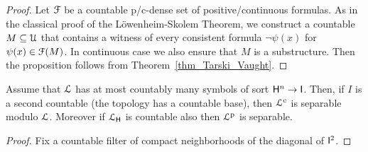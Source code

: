 \documentclass{amsproc}
\newcommand{\mylabel}[1]{{#1}\hfill}
\renewenvironment{itemize}
  {\begin{list}{$\triangleright$}{%
  \setlength{\parskip}{0mm}
  \setlength{\topsep}{.4\baselineskip}
  \setlength{\rightmargin}{0mm}
  \setlength{\listparindent}{0mm}
  \setlength{\itemindent}{0mm}
  \setlength{\labelwidth}{3ex}
  \setlength{\itemsep}{.2\baselineskip}
  \setlength{\parsep}{.2\baselineskip}
  \setlength{\partopsep}{0mm}
  \setlength{\labelsep}{1ex}
  \setlength{\leftmargin}{\labelwidth+\labelsep}
  \let\makelabel\mylabel}}{%
\end{list}}
\renewcommand*{\emph}[1]{%
   \smash{\tikz[baseline]\node[rectangle, fill=teal!25, rounded corners, inner xsep=0.5ex, inner ysep=0.2ex, anchor=base, minimum height = 2.7ex]{\strut #1};}}
\begin{document}
{\begin{proof}
  Let ${\EuScript F}$ be a countable p/c-dense set of positive/continuous formulas.
  As in the classical proof of the L\"owenheim-Skolem Theorem, we construct a countable $M\subseteq{\EuScript U}$ that contains a witness of every consistent formula $\neg\psi(x)$ for $\psi(x)\in{\EuScript F}(M)$.
  In continuous case we also ensure that $M$ is a substructure.
  Then the proposition follows from Theorem~\ref{thm_Tarski_Vaught}.
\end{proof}

\begin{proposition}
  Assume that ${\EuScript L}$ has at most countably many symbols of sort ${\sf H}^n\to {\sf I}$.
  Then, if $I$ is a second countable (the topology has a countable base), then ${\EuScript L}^{\rm c}$ is separable modulo ${\EuScript L}$.
  Moreover if ${\EuScript L}_{\sf H}$ is countable also then ${\EuScript L}^{\rm p}$ is separable.
\end{proposition}

\begin{proof}
  Fix a countable filter of compact neighborhoods of the diagonal of ${\sf I}^2$.  
\end{proof}











}
\end{document}
